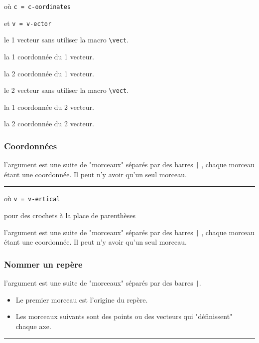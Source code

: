 \documentclass[12pt,a4paper]{article}
\newcommand\env[1]{\texttt{#1}}
\newcommand\macro[1]{\env{\textbackslash{}#1}}
\theoremstyle{definition}
\newcommand\separation{
	\medskip
	\hfill\rule{0.5\textwidth}{0.75pt}\hfill
	\medskip
}
\newcommand\mwhyprefix[2]{%
	\texttt{#1 = #1-#2}%
}
\begin{document}
 où \quad \mwhyprefix{c}{oordinates}
                                et \mwhyprefix{v}{ector}


 le 1\ier{} vecteur sans utiliser la macro \macro{vect}.

 la 1\iere{} coordonnée du 1\ier{} vecteur.

 la 2\ieme{} coordonnée du 1\ier{} vecteur.

 le 2\ieme{} vecteur sans utiliser la macro \macro{vect}.

 la 1\iere{} coordonnée du 2\ieme{} vecteur.

 la 2\ieme{} coordonnée du 2\ieme{} vecteur.
\subsubsection{Coordonnées}



\IDarg{} l'argument est une suite de "morceaux" séparés par des barres \verb+|+ , chaque morceau étant une coordonnée. Il peut n'y avoir qu'un seul morceau.


\separation


 où \quad \mwhyprefix{v}{ertical}

 pour des crochets à la place de parenthèses

\IDarg{} l'argument est une suite de "morceaux" séparés par des barres \verb+|+ , chaque morceau étant une coordonnée. Il peut n'y avoir qu'un seul morceau.
\subsubsection{Nommer un repère}



\IDarg{} l'argument est une suite de "morceaux" séparés par des barres \verb+|+.

\begin{itemize}[topsep=0pt]
	\item Le premier morceau est l'origine du repère.

	\item Les morceaux suivants sont des points ou des vecteurs qui "définissent" chaque axe.
\end{itemize}


\separation
\end{document}

